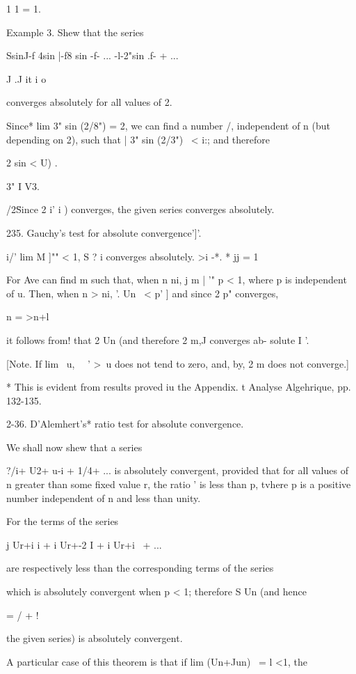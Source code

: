 1 1 = 1.

Example 3. Shew that the series

SsinJ-f 4sin |-f8 sin -f- ... -l-2"sin .f- + ...

 J .J it i o

converges absolutely for all values of 2.

Since* lim 3" sin (2/8") = 2, we can find a number /, independent of
n (but depending on 2), such that | 3" sin (2/3") \ < i:; and
therefore

2 sin < U) .

3" I V3.

  /2\" Since 2 i' i ) converges, the given series converges
absolutely.

235. Gauchy's test for absolute convergence']'.

i/' lim M ]"" < 1, S ? i converges absolutely. >i -*. * jj = 1

For Ave can find m such that, when n ni, j m | '" p < 1, where p is
independent of u. Then, when n > ni, '. Un \ < p' ] and since 2 p"
converges,

n = >n+l

it follows from! that 2 Un (and therefore 2 m,J converges ab-
solute I '.

[Note. If lim \ u, \ \ ' >\, u does not tend to zero, and, by, 2
m does not converge.]

* This is evident from results proved iu the Appendix. t Analyse
Algehrique, pp. 132-135.

%
%

2-36. D'Alemhert's* ratio test for absolute convergence.

We shall now shew that a series

?/i+ U2+ u-i + 1/4+ ... is absolutely convergent, provided that for
all values of n greater than some fixed value r, the ratio ' is less
than p, tvhere p is a positive number independent of n and less than
unity.

For the terms of the series

j Ur+i i + i Ur+-2 I + i Ur+i \ + ...

are respectively less than the corresponding terms of the series

which is absolutely convergent when p < 1; therefore S Un (and hence

  = / + !

the given series) is absolutely convergent.

A particular case of this theorem is that if lim (Un+Jun) \ = l <1,
the

